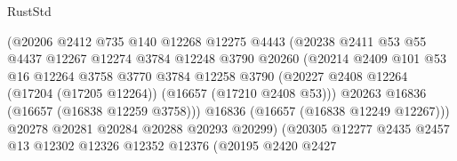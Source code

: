 \begin{lexlean}{RustStd}
\begin{coremodule}
                                  (@20206
                                    @2412
                                    @735
                                    @140
                                    @12268
                                    @12275
                                    @4443
                                    (@20238
                                      @2411
                                      @53
                                      @55
                                      @4437
                                      @12267
                                      @12274
                                      @3784
                                      @12248
                                      @3790
                                      @20260
                                      (@20214
                                        @2409
                                        @101
                                        @53
                                        @16
                                        @12264
                                        @3758
                                        @3770
                                        @3784
                                        @12258
                                        @3790
                                        (@20227
                                          @2408
                                          @12264
                                          (@17204 (@17205 @12264))
                                          (@16657 (@17210 @2408 @53)))
                                        @20263
                                        @16836
                                        (@16657 (@16838 @12259 @3758)))
                                      @16836
                                      (@16657 (@16838 @12249 @12267)))
                                    @20278
                                    @20281
                                    @20284
                                    @20288
                                    @20293
                                    @20299)
                                  (@20305
                                    @12277
                                    @2435
                                    @2457
                                    @13
                                    @12302
                                    @12326
                                    @12352
                                    @12376
                                    (@20195
                                      @2420
                                      @2427

\end{coremodule}
\end{lexlean}
